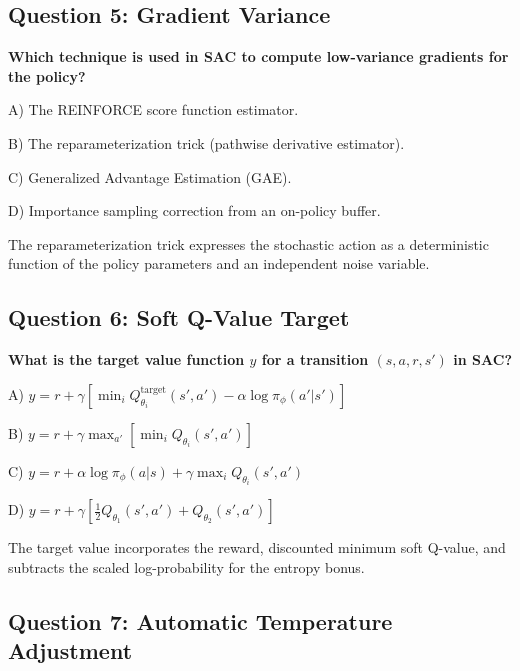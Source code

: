 \documentclass[12pt,a4paper]{article}
\theoremstyle{noteplain}
\theoremstyle{noteexercise}
\begin{document}
\subsection{Question 5: Gradient Variance}\label{ssec:q5}



\textbf{Which technique is used in SAC to compute low-variance gradients for the policy?}

A) The REINFORCE score function estimator.

B) The reparameterization trick (pathwise derivative estimator).

C) Generalized Advantage Estimation (GAE).

D) Importance sampling correction from an on-policy buffer.

\begin{keypoint}[Answer: B]

The reparameterization trick expresses the stochastic action as a deterministic function of the policy parameters and an independent noise variable.

\end{keypoint}



\subsection{Question 6: Soft Q-Value Target}\label{ssec:q6}



\textbf{What is the target value function $y$ for a transition $(s, a, r, s')$ in SAC?}

A) $y = r + \gamma[\min_i Q_{\theta_i}^{\text{target}}(s', a') - \alpha \log\pi_\phi(a'|s')]$

B) $y = r + \gamma \max_{a'} [\min_i Q_{\theta_i}(s', a')]$

C) $y = r + \alpha \log\pi_\phi(a|s) + \gamma \max_i Q_{\theta_i}(s', a')$

D) $y = r + \gamma [\frac{1}{2}Q_{\theta_1}(s', a') + Q_{\theta_2}(s', a')]$

\begin{keypoint}[Answer: A]

The target value incorporates the reward, discounted minimum soft Q-value, and subtracts the scaled log-probability for the entropy bonus.

\end{keypoint}



\subsection{Question 7: Automatic Temperature Adjustment}\label{ssec:q7}
\end{document}
